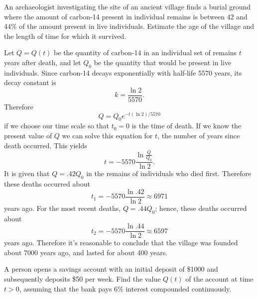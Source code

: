 \begin{example}\label{example:4.1.5}
An archaeologist investigating the site of an ancient village finds a
burial ground where the amount of carbon-14 present in individual
remains is between 42 and 44\% of the amount present in live
individuals. Estimate the age of the village and the length of time
for which it survived.
\end{example}

\begin{solution}
Let $Q=Q(t)$ be the quantity of carbon-14 in an individual
set of remains $t$ years after death, and let $Q_0$ be the quantity
that would be present in  live individuals.
Since carbon-14 decays exponentially with half-life 5570 years, its
decay constant is
\[
k=\frac{\ln2}{5570}.
\]
 Therefore
\[
Q=Q_0e^{-t(\ln2)/5570}
\]
 if we choose our time scale so that $t_0=0$ is the
time of death.  If we know the present value of $Q$  we
can solve this equation for $t$, the number of years since
death occurred.  This yields
\[
t=-5570\frac{\ln\frac{Q}{Q_0}}{\ln2}.
\]
It is given that $Q=.42Q_0$ in the remains of individuals who died
first. Therefore these deaths occurred about
\[
t_1=-5570\frac{\ln .42}{\ln2} \approx 6971
\]
 years ago.  For the most recent deaths, $Q=.44
Q_0$; hence, these deaths occurred about
\[
t_2=-5570 \frac{\ln .44}{\ln2} \approx 6597
\]
 years ago.  Therefore it's reasonable to conclude
that the village was founded about 7000 years ago,
and lasted for about 400 years.
\end{solution}



\begin{example}\label{example:4.1.6}
A person opens a savings account with an initial deposit of \$1000 and
subsequently deposits \$50 per week. Find the value $Q(t)$ of the
account at time $t > 0$, assuming that the bank pays 6\%
interest compounded continuously.
\end{example}

